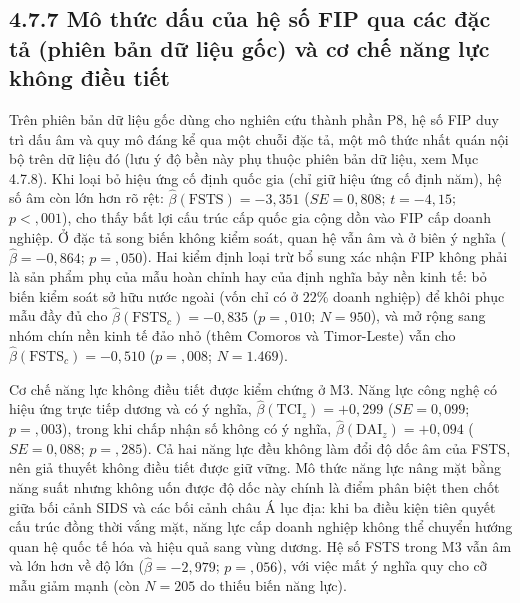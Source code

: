 \documentclass[
  a4paper,
  13pt]{extreport}
\begin{document}
\hypertarget{muxf4-thux1ee9c-dux1ea5u-cux1ee7a-hux1ec7-sux1ed1-fip-qua-cuxe1c-ux111ux1eb7c-tux1ea3-phiuxean-bux1ea3n-dux1eef-liux1ec7u-gux1ed1c-vuxe0-cux1a1-chux1ebf-nux103ng-lux1ef1c-khuxf4ng-ux111iux1ec1u-tiux1ebft}{%
\subsection{4.7.7 Mô thức dấu của hệ số FIP qua các đặc tả (phiên bản dữ
liệu gốc) và cơ chế năng lực không điều
tiết}\label{muxf4-thux1ee9c-dux1ea5u-cux1ee7a-hux1ec7-sux1ed1-fip-qua-cuxe1c-ux111ux1eb7c-tux1ea3-phiuxean-bux1ea3n-dux1eef-liux1ec7u-gux1ed1c-vuxe0-cux1a1-chux1ebf-nux103ng-lux1ef1c-khuxf4ng-ux111iux1ec1u-tiux1ebft}}

Trên phiên bản dữ liệu gốc dùng cho nghiên cứu thành phần P8, hệ số FIP
duy trì dấu âm và quy mô đáng kể qua một chuỗi đặc tả, một mô thức nhất
quán nội bộ trên dữ liệu đó (lưu ý độ bền này phụ thuộc phiên bản dữ
liệu, xem Mục 4.7.8). Khi loại bỏ hiệu ứng cố định quốc gia (chỉ giữ
hiệu ứng cố định năm), hệ số âm còn lớn hơn rõ rệt:
\(\hat{\beta}(\text{FSTS}) = -3{,}351\) (\(SE = 0{,}808\);
\(t = -4{,}15\); \(p < {,}001\)), cho thấy bất lợi cấu trúc cấp quốc gia
cộng dồn vào FIP cấp doanh nghiệp. Ở đặc tả song biến không kiểm soát,
quan hệ vẫn âm và ở biên ý nghĩa (\(\hat{\beta} = -0{,}864\);
\(p = {,}050\)). Hai kiểm định loại trừ bổ sung xác nhận FIP không phải
là sản phẩm phụ của mẫu hoàn chỉnh hay của định nghĩa bảy nền kinh tế:
bỏ biến kiểm soát sở hữu nước ngoài (vốn chỉ có ở \(22\%\) doanh nghiệp)
để khôi phục mẫu đầy đủ cho \(\hat{\beta}(\text{FSTS}_c) = -0{,}835\)
(\(p = {,}010\); \(N = 950\)), và mở rộng sang nhóm chín nền kinh tế đảo
nhỏ (thêm Comoros và Timor-Leste) vẫn cho
\(\hat{\beta}(\text{FSTS}_c) = -0{,}510\) (\(p = {,}008\);
\(N = 1.469\)).

Cơ chế năng lực không điều tiết được kiểm chứng ở M3. Năng lực công nghệ
có hiệu ứng trực tiếp dương và có ý nghĩa,
\(\hat{\beta}(\text{TCI}_z) = +0{,}299\) (\(SE = 0{,}099\);
\(p = {,}003\)), trong khi chấp nhận số không có ý nghĩa,
\(\hat{\beta}(\text{DAI}_z) = +0{,}094\) (\(SE = 0{,}088\);
\(p = {,}285\)). Cả hai năng lực đều không làm đổi độ dốc âm của FSTS,
nên giả thuyết không điều tiết được giữ vững. Mô thức năng lực nâng mặt
bằng năng suất nhưng không uốn được độ dốc này chính là điểm phân biệt
then chốt giữa bối cảnh SIDS và các bối cảnh châu Á lục địa: khi ba điều
kiện tiên quyết cấu trúc đồng thời vắng mặt, năng lực cấp doanh nghiệp
không thể chuyển hướng quan hệ quốc tế hóa và hiệu quả sang vùng dương.
Hệ số FSTS trong M3 vẫn âm và lớn hơn về độ lớn
(\(\hat{\beta} = -2{,}979\); \(p = {,}056\)), với việc mất ý nghĩa quy
cho cỡ mẫu giảm mạnh (còn \(N = 205\) do thiếu biến năng lực).
\end{document}
